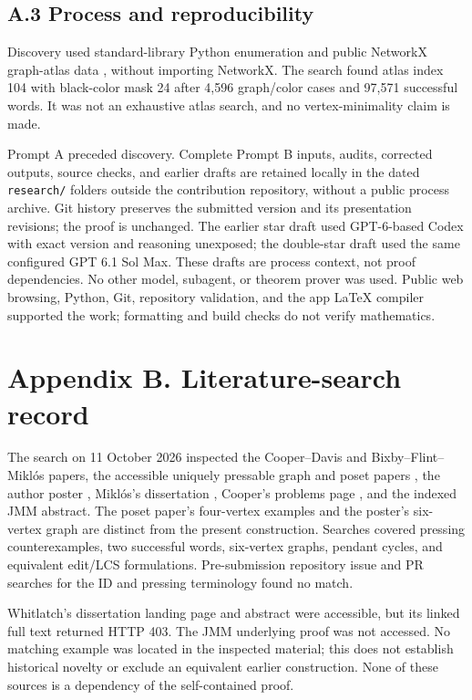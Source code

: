 \documentclass[11pt]{article}
\begin{document}
\subsection*{A.3 Process and reproducibility}
Discovery used standard-library Python enumeration and public NetworkX
graph-atlas data \cite{atlas}, without importing NetworkX. The search
found atlas index 104 with black-color mask 24 after 4,596 graph/color
cases and 97,571 successful words. It was not an exhaustive atlas search,
and no vertex-minimality claim is made.

Prompt A preceded discovery. Complete Prompt B inputs, audits, corrected
outputs, source checks, and earlier drafts are retained locally in the
dated \texttt{research/} folders outside the contribution repository,
without a public process archive. Git history preserves the submitted
version and its presentation revisions; the proof is unchanged.
The earlier star draft used GPT-6-based Codex with exact version and
reasoning unexposed; the double-star draft used the same configured
GPT 6.1 Sol Max. These drafts are process context, not proof dependencies.
No other model, subagent, or theorem prover was used. Public web browsing,
Python, Git, repository validation, and the app LaTeX compiler supported
the work; formatting and build checks do not verify mathematics.

\section*{Appendix B. Literature-search record}
The search on 11 October 2026 inspected the Cooper--Davis and
Bixby--Flint--Mikl\'os papers, the accessible uniquely pressable graph
and poset papers \cite{unique,vposets}, the author poster \cite{poster},
Mikl\'os's dissertation \cite[Chapter 9, pp.~167--178]{miklosthesis},
Cooper's problems page \cite{problems}, and the indexed JMM abstract.
The poset paper's four-vertex examples and the poster's six-vertex graph
are distinct from the present construction. Searches covered pressing
counterexamples, two successful words, six-vertex graphs, pendant cycles,
and equivalent edit/LCS formulations. Pre-submission repository issue
and PR searches for the ID and pressing terminology found no match.

Whitlatch's dissertation landing page and abstract \cite{whitlatchthesis}
were accessible, but its linked full text returned HTTP 403. The JMM
underlying proof was not accessed. No matching example was located in
the inspected material; this does not establish historical novelty or
exclude an equivalent earlier construction. None of these sources is
a dependency of the self-contained proof.
\end{document}
